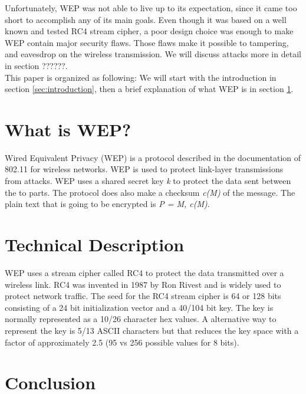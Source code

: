 \documentclass[twocolumn]{IEEEtran}
\begin{document}
Unfortunately, WEP was not able to live up to its expectation, since it came too short to
accomplish any of its main goals. Even though it was based on a well known and tested RC4 
stream cipher, a poor design choice was enough to make WEP contain major security flaws. Those
flaws make it possible to tampering, and eavesdrop on the wireless transmission. We will 
discuss attacks more in detail in section ??????. \\



This paper is organized as following: We will start with the introduction in 
section \ref{sec:introduction}, then a brief explanation of what WEP is in 
section \ref{sec:whatiswep}. 


\section {What is WEP?}
\label{sec:whatiswep}

Wired Equivalent Privacy (WEP) is a protocol described in the documentation of 802.11 for 
wireless networks. WEP is used to protect link-layer transmissions from attacks. WEP uses a 
shared secret key \emph{k} to protect the data sent between the to parts. The protocol does also
make a checksum \emph{c(M)} of the message. The plain text that is going to be encrypted is 
\emph{P = M, c(M)}. 



\section {Technical Description}
\label{sec:technical_description}

WEP uses a stream cipher called RC4 to protect the data transmitted over a wireless link. RC4 was invented in 1987 by Ron Rivest and is widely used to protect network traffic. The seed for the RC4 stream cipher is 64 or 128 bits consisting of a 24 bit initialization vector and a 40/104 bit key. The key is normally represented as a 10/26 character hex values. A alternative way to represent the key is 5/13 ASCII characters but that reduces the key space with a factor of approximately 2.5 (95 vs 256 possible values for 8 bits).





\section {Conclusion}
\label{sec:conclusion}
\end{document}
